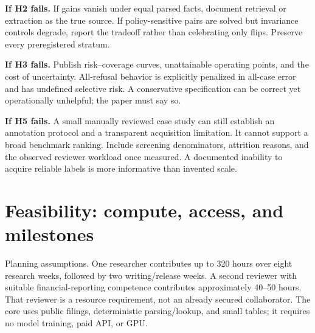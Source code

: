 \documentclass[11pt,a4paper]{article}
\newcommand{\pbreak}{\clearpage}
\newcommand{\lead}[1]{\textbf{\color{navy}#1}}
\newcommand{\status}[1]{\textsf{\color{teal}#1}}
\begin{document}
\lead{If H2 fails.} If gains vanish under equal parsed facts, document retrieval or extraction as the true source. If policy-sensitive pairs are solved but invariance controls degrade, report the tradeoff rather than celebrating only flips. Preserve every preregistered stratum.

\lead{If H3 fails.} Publish risk--coverage curves, unattainable operating points, and the cost of uncertainty. All-refusal behavior is explicitly penalized in all-case error and has undefined selective risk. A conservative specification can be correct yet operationally unhelpful; the paper must say so.

\lead{If H5 fails.} A small manually reviewed case study can still establish an annotation protocol and a transparent acquisition limitation. It cannot support a broad benchmark ranking. Include screening denominators, attrition reasons, and the observed reviewer workload once measured. A documented inability to acquire reliable labels is more informative than invented scale.

\pbreak
\section{Feasibility: compute, access, and milestones}
\status{Planning assumptions.} One researcher contributes up to 320 hours over eight research weeks, followed by two writing/release weeks. A second reviewer with suitable financial-reporting competence contributes approximately 40--50 hours. That reviewer is a resource requirement, not an already secured collaborator. The core uses public filings, deterministic parsing/lookup, and small tables; it requires no model training, paid API, or GPU.
\end{document}
